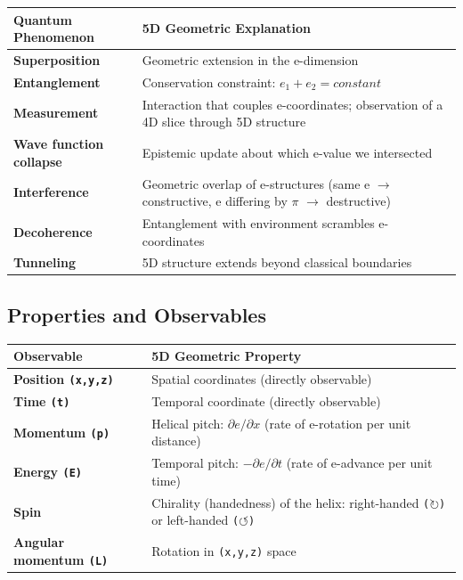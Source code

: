 \documentclass[aps,prd,preprint,superscriptaddress,longbibliography,floatfix]{revtex4-2}
\theoremstyle{remark}
\begin{document}
\begin{table}[H]
\begin{ruledtabular}
\begin{tabular}{p{7.5cm}p{7.5cm}}
Quantum Phenomenon & 5D Geometric Explanation \\
\hline
\textbf{Superposition} & Geometric extension in the e-dimension \\
\textbf{Entanglement} & Conservation constraint: $e_{1} + e_{2} = constant$ \\
\textbf{Measurement} & Interaction that couples e-coordinates; observation of a 4D slice through 5D structure \\
\textbf{Wave function collapse} & Epistemic update about which e-value we intersected \\
\textbf{Interference} & Geometric overlap of e-structures (same e $\to$ constructive, e differing by $\pi$ $\to$ destructive) \\
\textbf{Decoherence} & Entanglement with environment scrambles e-coordinates \\
\textbf{Tunneling} & 5D structure extends beyond classical boundaries \\
\end{tabular}
\end{ruledtabular}
\end{table}


\subsection{Properties and Observables}


\begin{table}[H]
\begin{ruledtabular}
\begin{tabular}{p{7.5cm}p{7.5cm}}
Observable & 5D Geometric Property \\
\hline
\textbf{Position \texttt{(x,y,z)}} & Spatial coordinates (directly observable) \\
\textbf{Time \texttt{(t)}} & Temporal coordinate (directly observable) \\
\textbf{Momentum \texttt{(p)}} & Helical pitch: $\partial e/\partial x$ (rate of e-rotation per unit distance) \\
\textbf{Energy \texttt{(E)}} & Temporal pitch: $-\partial e/\partial t$ (rate of e-advance per unit time) \\
\textbf{Spin} & Chirality (handedness) of the helix: right-handed \texttt{($\circlearrowright$)} or left-handed \texttt{($\circlearrowleft$)} \\
\textbf{Angular momentum \texttt{(L)}} & Rotation in \texttt{(x,y,z)} space \\
\end{tabular}
\end{ruledtabular}
\end{table}
\end{document}
